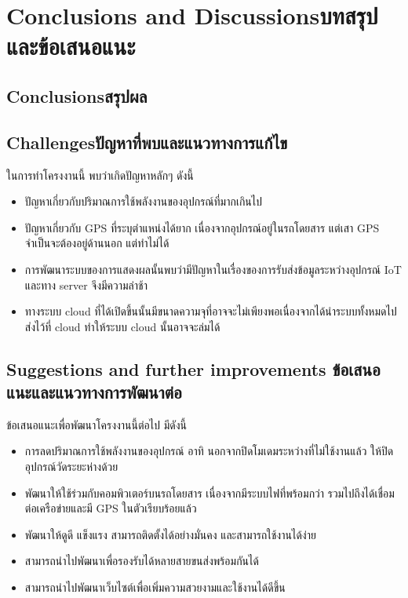 \chapter{\ifenglish Conclusions and Discussions\else บทสรุปและข้อเสนอแนะ\fi}

\section{\ifenglish Conclusions\else สรุปผล\fi}

\section{\ifenglish Challenges\else ปัญหาที่พบและแนวทางการแก้ไข\fi}

ในการทำโครงงานนี้ พบว่าเกิดปัญหาหลักๆ ดังนี้
\begin{itemize}
    \item ปัญหาเกี่ยวกับปริมาณการใช้พลังงานของอุปกรณ์ที่มากเกินไป
    \item ปัญหาเกี่ยวกับ GPS ที่ระบุตำแหน่งได้ยาก เนื่องจากอุปกรณ์อยู่ในรถโดยสาร แต่เสา GPS จำเป็นจะต้องอยู่ด้านนอก แต่ทำไม่ได้
    \item การพัฒนาระบบของการแสดงผลนั้นพบว่ามีปัญหาในเรื่องของการรับส่งข้อมูลระหว่างอุปกรณ์ IoT และทาง server จึงมีความล่าช้า
    \item ทางระบบ cloud ที่ได้เปิดขึ้นนั้นมีขนาดความจุที่อาจจะไม่เพียงพอเนื่องจากได้นำระบบทั้งหมดไปส่งไว้ที่ cloud ทำให้ระบบ cloud นั้นอาจจะล่มได้
  \end{itemize}
\section{\ifenglish%
Suggestions and further improvements
\else%
ข้อเสนอแนะและแนวทางการพัฒนาต่อ
\fi
}

ข้อเสนอแนะเพื่อพัฒนาโครงงานนี้ต่อไป มีดังนี้
\begin{itemize}
    \item การลดปริมาณการใช้พลังงานของอุปกรณ์ อาทิ นอกจากปิดโมเดมระหว่างที่ไม่ใช้งานแล้ว ให้ปิดอุปกรณ์วัดระยะห่างด้วย
    \item พัฒนาให้ใช้ร่วมกับคอมพิวเตอร์บนรถโดยสาร เนื่องจากมีระบบไฟที่พร้อมกว่า รวมไปถึงได้เชื่อมต่อเครือข่ายและมี GPS ในตัวเรียบร้อยแล้ว
    \item พัฒนาให้ดูดี แข็งแรง สามารถติดตั้งได้อย่างมั่นคง และสามารถใช้งานได้ง่าย
    \item สามารถนำไปพัฒนาเพื่อรองรับได้หลายสายขนส่งพร้อมกันได้
    \item สามารถนำไปพัฒนาเว็บไซต์เพื่อเพิ่มความสวยงามและใช้งานได้ดีขึ้น
  \end{itemize}